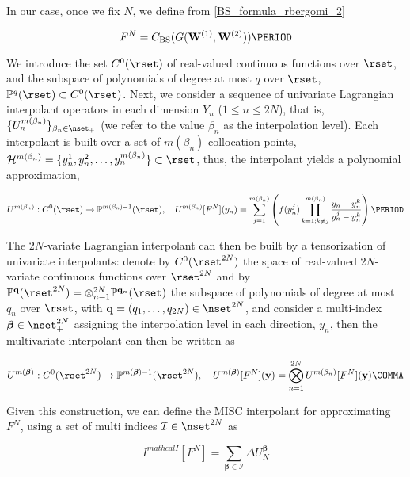 In our case, once we fix $N$, we define from \eqref{BS_formula_rbergomi_2}

\begin{equation}
F^N=C_{\text{BS}}(G(\mathbf{W}^{(1)},\mathbf{W}^{(2)})) \PERIOD
\end{equation}

We introduce the set $C^0(\rset)$ of real-valued continuous functions over $\rset$, and the subspace of polynomials of degree at most $q$ over $\rset$, $\mathbb{P}^q(\rset) \subset C^0(\rset)$. Next,
we consider a sequence of univariate Lagrangian interpolant operators in each dimension $Y_n$ ($1 \le n \le 2N$), that is, $\{U_n^{m(\beta_n)}\}_{\beta_n \in \nset_+}$ (we refer to the value $\beta_n$ as the interpolation level). Each interpolant is built over a set of $m(\beta_n)$ collocation points, $\mathcal{H}^{m(\beta_n)}=\{y^1_n,y^2_n,\dots,y^{m(\beta_n)}_n\} \subset \rset$, thus, the interpolant yields a polynomial approximation,


\begin{equation}
U^{m(\beta_n)}:C^0(\rset) \rightarrow \mathbb{P}^{m(\beta_n)-1}(\rset), \quad U^{m(\beta_n)}[F^N](y_n)= \sum_{j=1}^{m(\beta_n)} \left( f(y^j_n) \prod_{k=1;k \neq j}^{m(\beta_n)} \frac{y_n-y_n^k}{y_n^j-y_n^k}\right) \PERIOD
\end{equation}

The $2N$-variate Lagrangian interpolant can then be built by a tensorization of univariate interpolants: denote by $C^0(\rset^{2N})$ the space of real-valued $2N$-variate continuous functions over $\rset^{2N}$ and by $\mathbb{P}^{\mathbf{q}}(\rset^{2N}) = \otimes_{n=1}^{2N} \mathbb{P}^{\mathbf{q}_n}(\rset)$ the subspace of polynomials of degree at most $q_n$ over $\rset$, with $\mathbf{q}=(q_1,\dots,q_{2N})\in  \nset^{2N}$, and consider a multi-index $\boldsymbol{\beta} \in \nset^{2N}_+$ assigning the interpolation level in each direction, $y_n$, then  the multivariate interpolant can then be written as

$$U^{m(\boldsymbol{\beta})}: C^0(\rset^{2N}) \rightarrow \mathbb{P}^{m(\boldsymbol{\beta})-1}(\rset^{2N}) ,\quad  U^{m(\boldsymbol{\beta})}[F^N](\mathbf{y})= \bigotimes_{n = 1}^{2N} U^{m(\beta_n)} [F^N](\mathbf{y}) \COMMA $$


Given this construction, we can define the MISC interpolant  for approximating $F^N$, using a set of multi indices $\mathcal{I} \in \nset^{2N}$ as

\begin{equation}
I^{mathcal{I}}[F^N]= \sum_{\boldsymbol{\beta} \in \mathcal{I}} \Delta U_N^{\boldsymbol{\beta}}
\end{equation}

